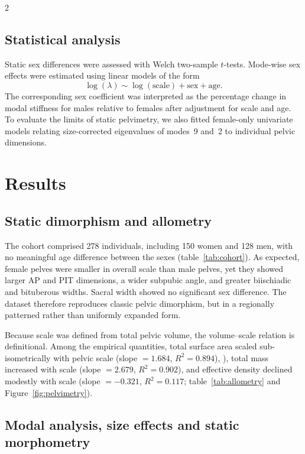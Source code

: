 \documentclass[openacc]{rsproca_new}
\begin{document}
\begin{multicols}{2}
\subsection{Statistical analysis}

Static sex differences were assessed with Welch two-sample $t$-tests. Mode-wise sex effects were estimated using linear models of the form
\begin{equation}
\log(\lambda) \sim \log(\mathrm{scale}) + \mathrm{sex} + \mathrm{age}.
\end{equation}
The corresponding sex coefficient was interpreted as the percentage change in modal stiffness for males relative to females after adjustment for scale and age. To evaluate the limits of static pelvimetry, we also fitted female-only univariate models relating size-corrected eigenvalues of modes~9 and~2 to individual pelvic dimensions.

\section{Results}

\subsection{Static dimorphism and allometry}

The cohort comprised 278 individuals, including 150 women and 128 men, with no meaningful age difference between the sexes (table~\ref{tab:cohort}). As expected, female pelves were smaller in overall scale than male pelves, yet they showed larger AP and PIT dimensions, a wider subpubic angle, and greater biischiadic and bituberous widths. Sacral width showed no significant sex difference. The dataset therefore reproduces classic pelvic dimorphism, but in a regionally patterned rather than uniformly expanded form.

Because scale was defined from total pelvic volume, the volume–scale relation is definitional. Among the empirical quantities, total surface area scaled sub-isometrically with pelvic scale (slope $=1.684$, $R^2=0.894$), ), total mass increased with scale (slope $=2.679$, $R^2=0.902$), and effective density
declined modestly with scale (slope $=-0.321$, $R^2=0.117$; table~\ref{tab:allometry} and Figure~\ref{fig:pelvimetry}).

\subsection{Modal analysis, size effects and static morphometry}


\end{multicols}
\end{document}
